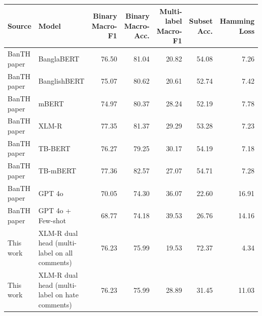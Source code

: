 \begin{tabular}{llrrrrr}
\toprule
Source & Model & Binary Macro-F1 & Binary Macro-Acc. & Multi-label Macro-F1 & Subset Acc. & Hamming Loss \\
\midrule
BanTH paper & BanglaBERT & 76.50 & 81.04 & 20.82 & 54.08 & 7.26 \\
BanTH paper & BanglishBERT & 75.07 & 80.62 & 20.61 & 52.74 & 7.42 \\
BanTH paper & mBERT & 74.97 & 80.37 & 28.24 & 52.19 & 7.78 \\
BanTH paper & XLM-R & 77.35 & 81.37 & 29.29 & 53.28 & 7.23 \\
BanTH paper & TB-BERT & 76.27 & 79.25 & 30.17 & 54.19 & 7.18 \\
BanTH paper & TB-mBERT & 77.36 & 82.57 & 27.07 & 54.71 & 7.28 \\
BanTH paper & GPT 4o & 70.05 & 74.30 & 36.07 & 22.60 & 16.91 \\
BanTH paper & GPT 4o + Few-shot & 68.77 & 74.18 & 39.53 & 26.76 & 14.16 \\
This work & XLM-R dual head (multi-label on all comments) & 76.23 & 75.99 & 19.53 & 72.37 & 4.34 \\
This work & XLM-R dual head (multi-label on hate comments) & 76.23 & 75.99 & 28.89 & 31.45 & 11.03 \\
\bottomrule
\end{tabular}
